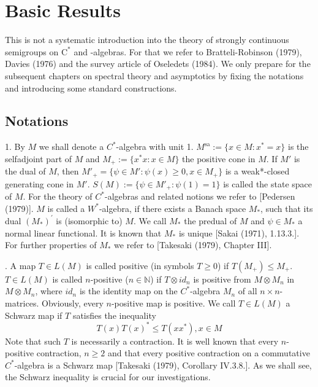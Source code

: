 
\chapter{Basic Results}%
This is not a systematic introduction into the theory of strongly continuous semigroups on $\mathrm{C}^{*}$ and \WA-algebras.
For that we refer to Bratteli-Robinson (1979), Davies (1976) and the survey article of Oseledets (1984).
We only prepare for the subsequent chapters on spectral theory and asymptotics by fixing the notations and introducing some standard constructions.
\section{Notations}
1. By $M$ we shall denote a $C^{*}$-algebra with unit 1.
$M^{\text{sa}} := \{x \in M : x^{*} = x\}$ is the selfadjoint part of $M$ and $M_{+} := \{x^{*} x : x \in M\}$ the positive cone in $M$.
If $M'$ is the dual of $M$, then $M'_{+} = \{\psi \in M' : \psi(x) \geq 0, x \in M_{+}\}$ is a weak*-closed generating cone in $M'$.
$S(M) := \{\psi \in M'_{+} : \psi(1) = 1\}$ is called the state space of $M$.
For the theory of $C^{*}$-algebras and related notions we refer to [Pedersen (1979)].
$M$ is called a $W^{*}$-algebra, if there exists a Banach space $M_{*}$, such that its dual $(M_{*})^{'}$ is (isomorphic to) $M$.
We call $M_{*}$ the predual of $M$ and $\psi \in M_{*}$ a normal linear functional.
It is known that $M_{*}$ is unique [Sakai (1971), 1.13.3.].
For further properties of $M_{*}$ we refer to [Takesaki (1979), Chapter III].

\smallskip
{}. A map $T \in L(M)$ is called positive (in symbols $T \geq 0$) if $T(M_{+}) \leq M_{+}$.
$T \in L(M)$ is called $n$-positive ($n \in \mathbb{N}$) if $T \otimes id_n$ is positive from $M \otimes M_n$ in $M \otimes M_n$, where $id_n$ is the identity map on the $C^{*}$-algebra $M_n$ of all $n \times n$-matrices.
Obviously, every $n$-positive map is positive.
We call $T \in L(M)$ a Schwarz map if $T$ satisfies the inequality
\[
T(x)T(x)^{*} \leq T(xx^{*}), x \in M
\]
Note that such $T$ is necessarily a contraction.
It is well known that every $n$-positive contraction, $n \geq 2$ and that every positive contraction on a commutative $C^{*}$-algebra is a Schwarz map [Takesaki (1979), Corollary IV.3.8.].
As we shall see, the Schwarz inequality is crucial for our investigations.


